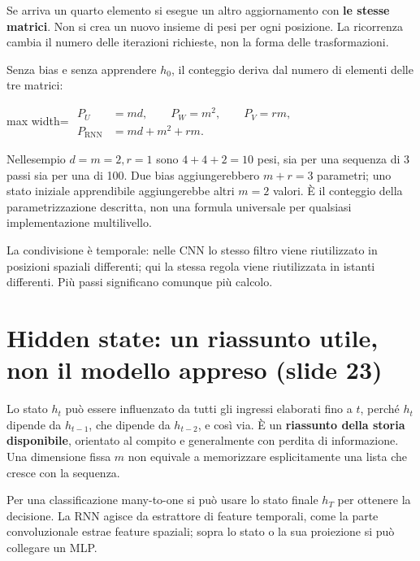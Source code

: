 \documentclass[11pt,a4paper,oneside,openany]{book}
\begin{document}
Se arriva un quarto elemento si esegue un altro aggiornamento con \textbf{le stesse matrici}. Non si crea un nuovo insieme di pesi per ogni posizione. La ricorrenza cambia il numero delle iterazioni richieste, non la forma delle trasformazioni.

Senza bias e senza apprendere \(h_0\), il conteggio deriva dal numero di elementi delle tre matrici:

\begin{center}
\begin{adjustbox}{max width=\linewidth}
$\displaystyle 
\begin{aligned}
P_U&=md,\qquad P_W=m^2,\qquad P_V=rm,\\
\boxed{P_{\mathrm{RNN}}}&=\boxed{md+m^2+rm.}
\end{aligned}
$
\end{adjustbox}
\end{center}

Nell\textquotesingle esempio \(d=m=2,r=1\) sono \(4+4+2=10\) pesi, sia per una sequenza di 3 passi sia per una di 100. Due bias aggiungerebbero \(m+r=3\) parametri; uno stato iniziale apprendibile aggiungerebbe altri \(m=2\) valori. È il conteggio della parametrizzazione descritta, non una formula universale per qualsiasi implementazione multilivello.

La condivisione è temporale: nelle CNN lo stesso filtro viene riutilizzato in posizioni spaziali differenti; qui la stessa regola viene riutilizzata in istanti differenti. Più passi significano comunque più calcolo.

\section{Hidden state: un riassunto utile, non il modello appreso (slide 23)}\label{f03-r346}

Lo stato \(h_t\) può essere influenzato da tutti gli ingressi elaborati fino a \(t\), perché \(h_t\) dipende da \(h_{t-1}\), che dipende da \(h_{t-2}\), e così via. È un \textbf{riassunto della storia disponibile}, orientato al compito e generalmente con perdita di informazione. Una dimensione fissa \(m\) non equivale a memorizzare esplicitamente una lista che cresce con la sequenza.

Per una classificazione many-to-one si può usare lo stato finale \(h_T\) per ottenere la decisione. La RNN agisce da estrattore di feature temporali, come la parte convoluzionale estrae feature spaziali; sopra lo stato o la sua proiezione si può collegare un MLP.
\end{document}
